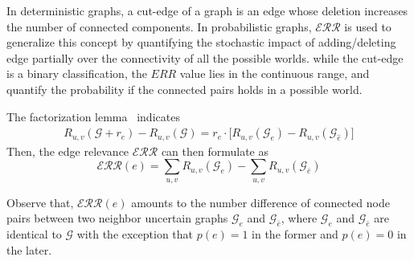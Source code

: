 In deterministic graphs, a cut-edge of a graph is an edge whose deletion increases the number of connected components. 
In probabilistic graphs, $\mathcal{ERR}$ is used to generalize this concept by quantifying the stochastic impact of adding/deleting edge partially over the connectivity of all the possible worlds.
while the cut-edge is a binary classification, the $ERR$ value lies in the continuous range, and quantify the probability if the connected pairs holds in a possible world. 

The factorization lemma~\cite{Jin_Distance_2011} indicates
\begin{align*}
    R_{u,v}(\mathcal{G}+r_{e}) -R_{u,v}(\mathcal{G}) = r_{e} \cdot \big[ R_{u,v}(\mathcal{G}_{e})-R_{u,v}(\mathcal{G}_{\hat{e}}) \big]
\end{align*}
Then, the edge relevance $\mathcal{ERR}$ can then formulate as
\begin{equation*}
    \mathcal{ERR}(e) = \sum_{u,v} R_{u,v}(\mathcal{G}_{e}) \big- \sum_{u,v} R_{u,v}(\mathcal{G}_{\bar{e}})
\end{equation*}

Observe that, $\mathcal{ERR}(e)$ amounts to the number difference of connected node pairs between two neighbor uncertain graphs $\mathcal{G}_{e}$ and $\mathcal{G}_{\bar{e}}$, 
where $\mathcal{G}_{e}$ and $\mathcal{G}_{\bar{e}}$ are identical to $\mathcal{G}$ with the exception that $p(e)=1$ in the former and $p(e)=0$ in the later. 
















